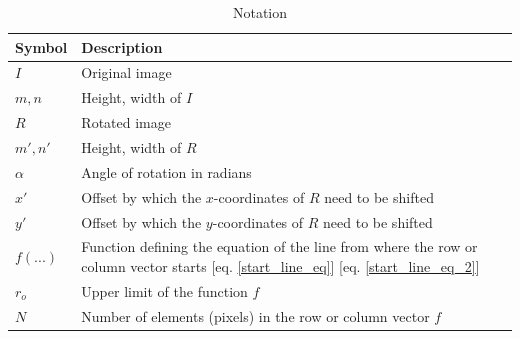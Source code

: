\documentclass[conference]{IEEEtran}
\begin{document}
\begin{table}[t]
    \begin{threeparttable}
        \caption{Notation}
        \label{table:notations}
        \centering
        \begin{tabular}{|m{1.5cm}|m{6cm}|}
            \hline
            \textbf{Symbol}  & \textbf{Description}                                                                                                                        \\
            \hline
            $I$              & Original image                                                                                                                              \\ \hline
            $m, n$           & Height, width of $I$                                                                                                                        \\ \hline
            $R$              & Rotated image                                                                                                                               \\ \hline
            $m', n'$         & Height, width of $R$                                                                                                                        \\ \hline
            $\alpha$         & Angle of rotation in radians                                                                                                                \\ \hline
            $x'$             & Offset by which the $x$-coordinates of $R$ need to be shifted                                                                               \\ \hline
            $y'$             & Offset by which the $y$-coordinates of $R$ need to be shifted                                                                               \\ \hline
            $f(...)$         & Function defining the equation of the line from where the row or column vector starts [eq. \ref{start_line_eq}] [eq. \ref{start_line_eq_2}] \\ \hline
            $r_o$            & Upper limit of the function $f$                                                                                                             \\ \hline
            $N$              & Number of elements (pixels) in the row or column vector $f$                                                                                 \\ \hline

\end{tabular}
\end{threeparttable}
\end{table}
\end{document}
